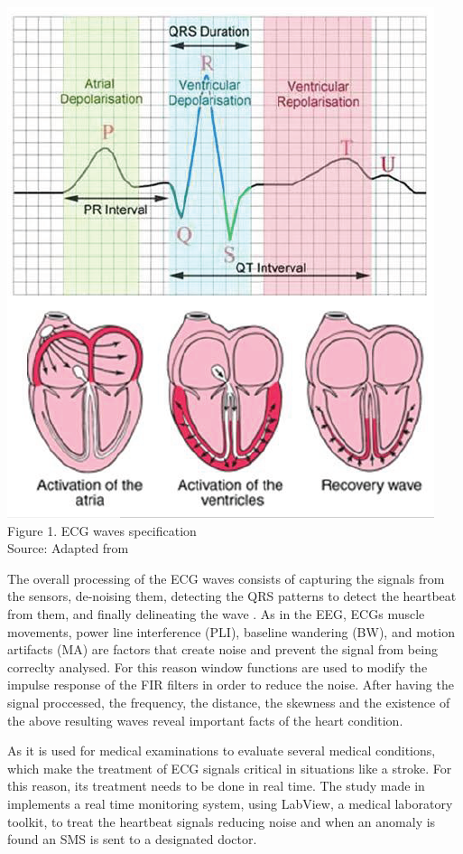 \begin{center}
\includegraphics[scale=0.5]{images/ECG.png}
\\Figure 1. ECG waves specification
\\Source: Adapted from \cite{ECGEventB}
\end{center}


The overall processing of the ECG waves consists of capturing the signals from the sensors, de-noising them, detecting the QRS patterns to detect the heartbeat from them, and finally delineating the wave \cite{ECGsignalprocc}.
As in the EEG, ECGs muscle movements, power line interference (PLI), baseline wandering (BW), and motion artifacts (MA) are factors that create noise and prevent the signal from being correclty analysed. For this reason window functions are used to modify the impulse response of the FIR filters in order to reduce the noise.  After having the signal proccessed, the frequency, the distance, the skewness and the existence of the above resulting waves reveal important facts of the heart condition.


As it is used for medical examinations to evaluate several medical conditions, which make the treatment of ECG signals critical in situations like a stroke. For this reason, its treatment needs to be done in real time. The study made in \cite{ECGsyc} implements a real time monitoring system, using LabView, a medical laboratory toolkit, to treat the heartbeat signals reducing noise and when an anomaly is found an SMS is sent to a designated doctor.


